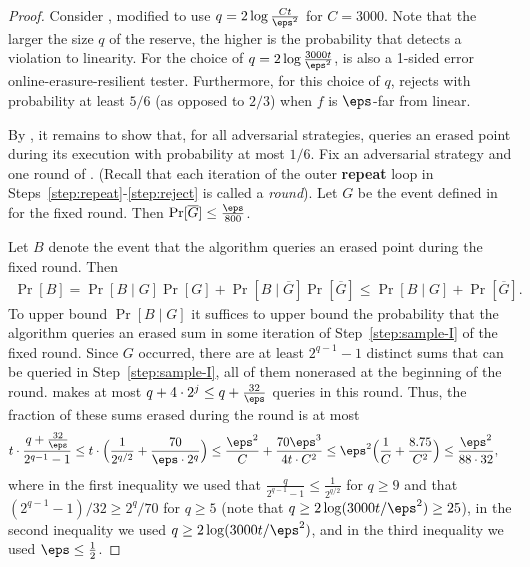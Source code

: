 \documentclass{toc}
\begin{document}
\begin{proof} %

Consider , modified to use $q=2\log \frac{Ct}{\eps^2}$ for $C=3000$. Note that the larger the size $q$ of the reserve, the higher is the probability that  detects a violation to linearity. For the choice of  $q=2\log \frac{3000t}{\eps^2}$,  is also a 1-sided error online-erasure-resilient tester. Furthermore, for this choice of $q$,   rejects with probability at least $5/6$ (as opposed to $2/3$) when $f$ is $\eps$-far from linear. 

By , it remains to show that, for all adversarial strategies,  queries an erased point during its execution with probability at most $1/6$.
%
Fix an adversarial strategy and one round of . (Recall that each iteration of the outer \textbf{repeat} loop in Steps~\ref{step:repeat}-\ref{step:reject} is called a {\em round}). Let $G$ be the event defined in  for the fixed round. Then $\Pr[\overline{G}] \leq \frac{\eps}{800}$. 

Let $B$ denote the event that the algorithm queries an erased point during the fixed round. Then
\begin{align*}
    \Pr[B] = \Pr[B \mid G]\Pr[G] + \Pr[B \mid \overline{G}]\Pr[\overline{G}] \leq \Pr[B \mid G] + \Pr[\overline{G}].
\end{align*}
To upper bound $\Pr[B \mid G]$ it suffices to upper bound the probability that the algorithm queries an erased sum in some iteration of Step~\ref{step:sample-I} of the fixed round. Since $G$ occurred, there are at least $2^{q-1}-1$ distinct sums that can be queried in Step~\ref{step:sample-I}, all of them nonerased at the beginning of the round.  makes at most $q + 4\cdot 2^j \leq q + \frac{32}{\eps}$ queries in this round. Thus, the fraction of these sums erased during the round is at most
\begin{align*}
    t\cdot\frac{q + \frac{32}{\eps}}{2^{q-1}-1}
   &\leq  t\cdot \Big(\frac{1}{2^{q/2}} + \frac{70}{\eps \cdot 2^{q}} \Big)
   \leq 
 \frac{\eps^2}{C} + \frac{70\eps^3}{4t \cdot C^2 }  
   \leq   \eps^2 \Bigl( \frac{1}{C} +  \frac{8.75}{C^2} \Bigr)
   \leq \frac{\eps^2}{88\cdot 32},
\end{align*}
where in the first inequality we used that $\frac{q}{2^{q-1}-1} \leq \frac{1}{2^{q/2}}$  for $q \geq 9$ and that $(2^{q-1}-1)/32\geq  2^{q}/70$ for $q\geq 5$ (note that $q \geq 2\log(3000t/\eps^2)\geq  25$), in the second inequality we used $q \geq 2\log(3000t/\eps^2)$, and in the third inequality we used $\eps \leq \frac{1}{2}$. 


\end{proof}
\end{document}
